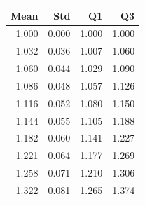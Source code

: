 \begin{tabular}{rrrr}
\toprule
Mean & Std & Q1 & Q3 \\
\midrule
1.000 & 0.000 & 1.000 & 1.000 \\
1.032 & 0.036 & 1.007 & 1.060 \\
1.060 & 0.044 & 1.029 & 1.090 \\
1.086 & 0.048 & 1.057 & 1.126 \\
1.116 & 0.052 & 1.080 & 1.150 \\
1.144 & 0.055 & 1.105 & 1.188 \\
1.182 & 0.060 & 1.141 & 1.227 \\
1.221 & 0.064 & 1.177 & 1.269 \\
1.258 & 0.071 & 1.210 & 1.306 \\
1.322 & 0.081 & 1.265 & 1.374 \\
\bottomrule
\end{tabular}
